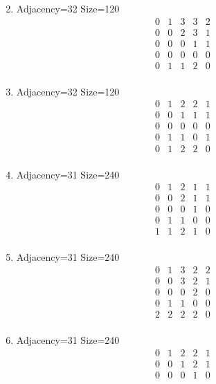\documentclass[12pt]{article}
\begin{document}
\begin{multicols}{3}
\begin{enumerate}
\begin{equation*}
\end{equation*}
\item Adjacency=32 Size=120
\begin{equation*}
\begin{array}{ccccc}
0&1&3&3&2\\
0&0&2&3&1\\
0&0&0&1&1\\
0&0&0&0&0\\
0&1&1&2&0\\
\end{array}
\end{equation*}
\item Adjacency=32 Size=120
\begin{equation*}
\begin{array}{ccccc}
0&1&2&2&1\\
0&0&1&1&1\\
0&0&0&0&0\\
0&1&1&0&1\\
0&1&2&2&0\\
\end{array}
\end{equation*}
\item Adjacency=31 Size=240
\begin{equation*}
\begin{array}{ccccc}
0&1&2&1&1\\
0&0&2&1&1\\
0&0&0&1&0\\
0&1&1&0&0\\
1&1&2&1&0\\
\end{array}
\end{equation*}
\item Adjacency=31 Size=240
\begin{equation*}
\begin{array}{ccccc}
0&1&3&2&2\\
0&0&3&2&1\\
0&0&0&2&0\\
0&1&1&0&0\\
2&2&2&2&0\\
\end{array}
\end{equation*}
\item Adjacency=31 Size=240
\begin{equation*}
\begin{array}{ccccc}
0&1&2&2&1\\
0&0&1&2&1\\
0&0&0&1&0\\

\end{array}
\end{equation*}
\end{enumerate}
\end{multicols}
\end{document}
